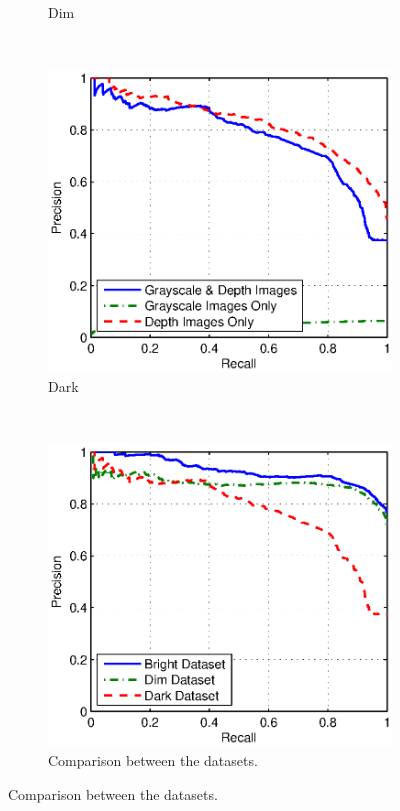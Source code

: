 \documentclass[]{spie}  %
\begin{document}
\begin{figure}
\begin{subfigure}[b]{0.43\textwidth}
        \caption{Dim}
        \label{subfig:pr_dim}
        \end{subfigure}
        ~
        \begin{subfigure}[b]{0.43\textwidth}
        \centering
        \includegraphics[trim = 0mm 0mm 5mm 0mm, clip, width=\textwidth]{figures/pr_dark.eps}    
        \caption{Dark}
        \label{subfig:pr_dark}
        \end{subfigure}
        ~ 
        \begin{subfigure}[b]{0.43\textwidth}
        \centering
        \includegraphics[trim = 0mm 0mm 5mm 0mm, clip, width=\textwidth]{figures/pr_all.eps}    
        \caption{Comparison between the datasets.}
        \label{subfig:pr_all}
        \end{subfigure}


\end{figure}
\end{document}
